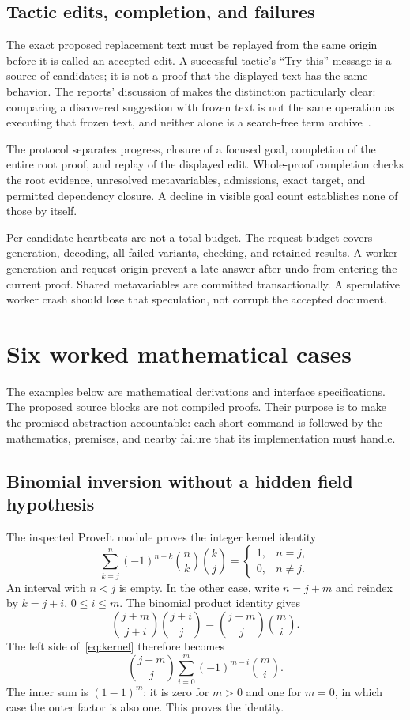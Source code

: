 \documentclass[11pt,a4paper]{article}
\newcommand{\code}[1]{\texttt{\detokenize{#1}}}
\theoremstyle{remark}\newtheorem{example}[proposition]{Example}
\begin{document}
\subsection{Tactic edits, completion, and failures}
The exact proposed replacement text must be replayed from the same origin before it is called an accepted edit. A successful tactic's ``Try this'' message is a source of candidates; it is not a proof that the displayed text has the same behavior. The reports' discussion of \code{says} makes the distinction particularly clear: comparing a discovered suggestion with frozen text is not the same operation as executing that frozen text, and neither alone is a search-free term archive~\cite{synthesis,blueprints}.

The protocol separates progress, closure of a focused goal, completion of the entire root proof, and replay of the displayed edit. Whole-proof completion checks the root evidence, unresolved metavariables, admissions, exact target, and permitted dependency closure. A decline in visible goal count establishes none of those by itself.

Per-candidate heartbeats are not a total budget. The request budget covers generation, decoding, all failed variants, checking, and retained results. A worker generation and request origin prevent a late answer after undo from entering the current proof. Shared metavariables are committed transactionally. A speculative worker crash should lose that speculation, not corrupt the accepted document.

\section{Six worked mathematical cases}\label{sec:cases}
The examples below are mathematical derivations and interface specifications. The proposed source blocks are not compiled proofs. Their purpose is to make the promised abstraction accountable: each short command is followed by the mathematics, premises, and nearby failure that its implementation must handle.

\subsection{Binomial inversion without a hidden field hypothesis}\label{sec:binomialcase}
The inspected ProveIt module proves the integer kernel identity
\begin{equation}\label{eq:kernel}
 \sum_{k=j}^{n}(-1)^{n-k}\binom nk\binom kj
 =\begin{cases}1,&n=j,\\0,&n\ne j.\end{cases}
\end{equation}
An interval with $n<j$ is empty. In the other case, write $n=j+m$ and reindex by $k=j+i$, $0\leq i\leq m$. The binomial product identity gives
\[
 \binom{j+m}{j+i}\binom{j+i}{j}
 =\binom{j+m}{j}\binom mi.
\]
The left side of~\eqref{eq:kernel} therefore becomes
\[
 \binom{j+m}{j}\sum_{i=0}^{m}(-1)^{m-i}\binom mi.
\]
The inner sum is $(1-1)^m$: it is zero for $m>0$ and one for $m=0$, in which case the outer factor is also one. This proves the identity.
\end{document}
